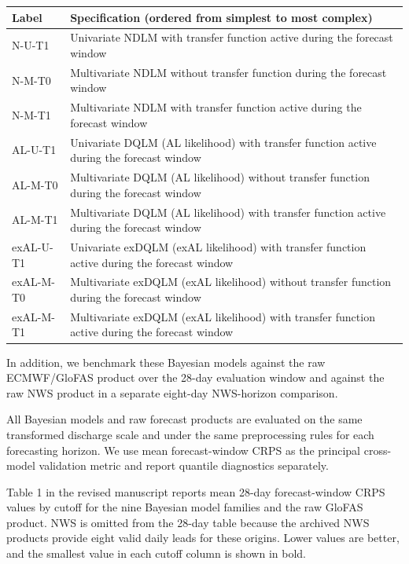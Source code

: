 \documentclass[11pt,letterpaper]{article}
\newenvironment{responsebox}{\begin{mdframed}[style=plainbox]}{\end{mdframed}}
\begin{document}
\begin{responsebox}
\begin{center}
\scriptsize
\setlength{\tabcolsep}{4pt}
\begin{tabular}{>{\ttfamily}l >{\raggedright\arraybackslash}p{11cm}}
\toprule
Label & Specification (ordered from simplest to most complex) \\
\midrule
N-U-T1 & Univariate NDLM with transfer function active during the forecast window \\
N-M-T0 & Multivariate NDLM without transfer function during the forecast window \\
N-M-T1 & Multivariate NDLM with transfer function active during the forecast window \\
AL-U-T1 & Univariate DQLM (AL likelihood) with transfer function active during the forecast window \\
AL-M-T0 & Multivariate DQLM (AL likelihood) without transfer function during the forecast window \\
AL-M-T1 & Multivariate DQLM (AL likelihood) with transfer function active during the forecast window \\
exAL-U-T1 & Univariate exDQLM (exAL likelihood) with transfer function active during the forecast window \\
exAL-M-T0 & Multivariate exDQLM (exAL likelihood) without transfer function during the forecast window \\
exAL-M-T1 & Multivariate exDQLM (exAL likelihood) with transfer function active during the forecast window \\
\bottomrule
\end{tabular}
\end{center}

In addition, we benchmark these Bayesian models against the raw ECMWF/GloFAS product over the 28-day evaluation window and against the raw NWS product in a separate eight-day NWS-horizon comparison.

All Bayesian models and raw forecast products are evaluated on the same transformed discharge scale and under the same preprocessing rules for each forecasting horizon. We use mean forecast-window CRPS as the principal cross-model validation metric and report quantile diagnostics separately.

\medskip
\noindent Table 1 in the revised manuscript reports mean 28-day forecast-window CRPS values by cutoff for the nine Bayesian model families and the raw GloFAS product. NWS is omitted from the 28-day table because the archived NWS products provide eight valid daily leads for these origins. Lower values are better, and the smallest value in each cutoff column is shown in bold.\par
\medskip


\end{responsebox}
\end{document}
